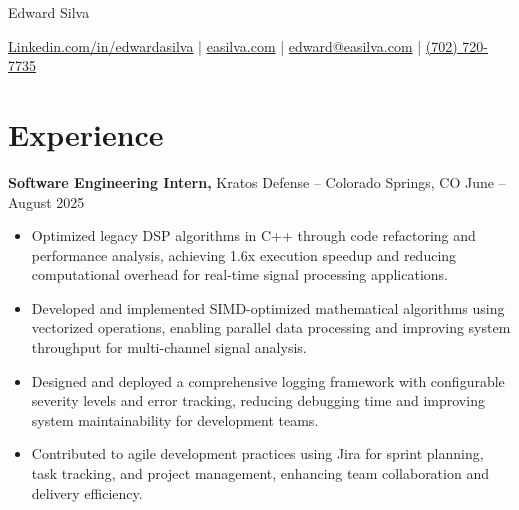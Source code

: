 \documentclass[11pt]{article}       %
\begin{document}
\centerline{\huge Edward Silva}
\vspace{5pt}

\centerline{
\href{https://www.linkedin.com/in/edwardasilva/}{Linkedin.com/in/edwardasilva}
| \href{https://easilva.com}{easilva.com}
| \href{mailto:edward@easilva.edu}{edward@easilva.com} 
| \href{tel:7027207735}{(702) 720-7735}
}

\vspace{-14pt}
\section*{Experience}
\vspace{5pt}

\textbf{Software Engineering Intern, }{Kratos Defense} -- Colorado Springs, CO \hfill June -- August 2025 \\
\vspace{-5pt}
\begin{itemize}
  \item Optimized legacy DSP algorithms in C++ through code refactoring and performance analysis, achieving 1.6x execution speedup and reducing computational overhead for real-time signal processing applications.
  \item Developed and implemented SIMD-optimized mathematical algorithms using vectorized operations, enabling parallel data processing and improving system throughput for multi-channel signal analysis.
  \item Designed and deployed a comprehensive logging framework with configurable severity levels and error tracking, reducing debugging time and improving system maintainability for development teams.
  \item Contributed to agile development practices using Jira for sprint planning, task tracking, and project management, enhancing team collaboration and delivery efficiency.
\end{itemize}
\end{document}
